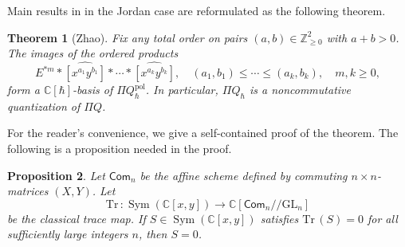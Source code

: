\documentclass[11pt,reqno]{amsart}
\newtheorem{theorem}{Theorem}[section]
\newtheorem{proposition}[theorem]{Proposition}
\theoremstyle{definition}
\newcommand{\bbC}{\mathbb{C}}
\newcommand{\bbZ}{\mathbb{Z}}
\newcommand{\GL}{\mathrm{GL}}
\newcommand{\Tr}{\mathrm{Tr} \,}
\newcommand{\Sym}{\operatorname{Sym}}
\newcommand{\Com}{\mathsf{Com}}
\newcommand{\pol}{\mathrm{pol}}
\begin{document}
Main results in \cite{Zhao2021Com,Zhao2023Non} in the Jordan case are reformulated as the following theorem.
\begin{theorem}[Zhao]
\label{thm: noncom quant red for quiver}
Fix any total order on pairs \((a,b)\in\bbZ_{\geq0}^2\) with
\(a+b>0\).
The images of the ordered products
\begin{equation}\label{eq:preproj pbw basis}
E^{*m} * \widehat{[x^{a_1}y^{b_1}]} * \cdots * \widehat{[x^{a_k}y^{b_k}]},
\quad
(a_1,b_1)\leq\cdots\leq(a_k,b_k),\quad m,k\geq0,
\end{equation}
form a \(\bbC[\hbar]\)-basis of \(\Pi Q_\hbar^{\pol}\).
In particular,
\(\Pi Q_\hbar\) is a noncommutative quantization of
\(\Pi Q\).
\end{theorem}
For the reader's convenience,
we give a self-contained proof of the theorem.
The following is a proposition needed in the proof.
\begin{proposition}\label{prop: joint inj}
Let
\(\Com_n\) be the affine
scheme defined by commuting \(n \times n\)-matrices \((X,Y)\).
Let
\[
\Tr:
\Sym(\bbC[x,y]) \to
\bbC [\Com_n // \GL_n]
\]
be the classical trace map.
If \(S\in \Sym(\bbC [x,y])\) satisfies
\(\Tr(S)=0\) for all sufficiently large
integers \(n\), then \(S=0\).
\end{proposition}
\end{document}

